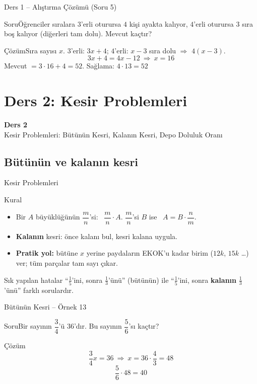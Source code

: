 \documentclass[aspectratio=169,11pt]{beamer}
\newcommand{\soru}[3]{%
\begin{frame}{#1}
  \begin{block}{Soru}\large #2\end{block}
  \pause
  \begin{exampleblock}{Çözüm}\large #3\end{exampleblock}
\end{frame}}
\begin{document}
\soru{Ders 1 -- Alıştırma Çözümü (Soru 5)}
{Öğrenciler sıralara \(3\)'erli oturursa \(4\) kişi ayakta kalıyor, \(4\)'erli oturursa \(3\) sıra boş kalıyor (diğerleri tam dolu). Mevcut kaçtır?}
{Sıra sayısı \(x\). \quad \(3\)'erli: \(3x+4\); \quad \(4\)'erli: \(x-3\) sıra dolu \(\Rightarrow\) \(4(x-3)\).
\[3x+4=4x-12\ \Rightarrow\ x=16\]
Mevcut \(=3\cdot 16+4=52\). \quad Sağlama: \(4\cdot 13=52\) \checkmark}


\section{Ders 2: Kesir Problemleri}
\begin{frame}
\centering\Large\color{anamavi}\textbf{Ders 2}\\[6pt]\normalsize Kesir Problemleri: Bütünün Kesri, Kalanın Kesri, Depo Doluluk Oranı
\end{frame}

\subsection{Bütünün ve kalanın kesri}
\begin{frame}{Kesir Problemleri}
\begin{block}{Kural}
\begin{itemize}
\item Bir \(A\) büyüklüğünün \(\dfrac{m}{n}\)'si: \ \(\dfrac{m}{n}\cdot A\). \quad \(\dfrac{m}{n}\)'si \(B\) ise \ \(A=B\cdot\dfrac{n}{m}\).
\item \textbf{Kalanın} kesri: önce kalanı bul, kesri kalana uygula.
\item \textbf{Pratik yol:} bütüne \(x\) yerine paydaların EKOK'u kadar birim (\(12k\), \(15k\) \dots) ver; tüm parçalar tam sayı çıkar.
\end{itemize}
\end{block}
\begin{alertblock}{Sık yapılan hatalar}
``\(\frac{1}{5}\)'ini, sonra \(\frac{1}{3}\)'ünü'' (bütünün) ile ``\(\frac{1}{5}\)'ini, sonra \textbf{kalanın} \(\frac{1}{3}\)'ünü'' farklı sorulardır.
\end{alertblock}
\end{frame}

\soru{Bütünün Kesri -- Örnek 13}
{Bir sayının \(\dfrac{3}{4}\)'ü \(36\)'dır. Bu sayının \(\dfrac{5}{6}\)'sı kaçtır?}
{\[\frac{3}{4}x=36\ \Rightarrow\ x=36\cdot\frac{4}{3}=48\]
\[\frac{5}{6}\cdot 48=40\]}
\end{document}
